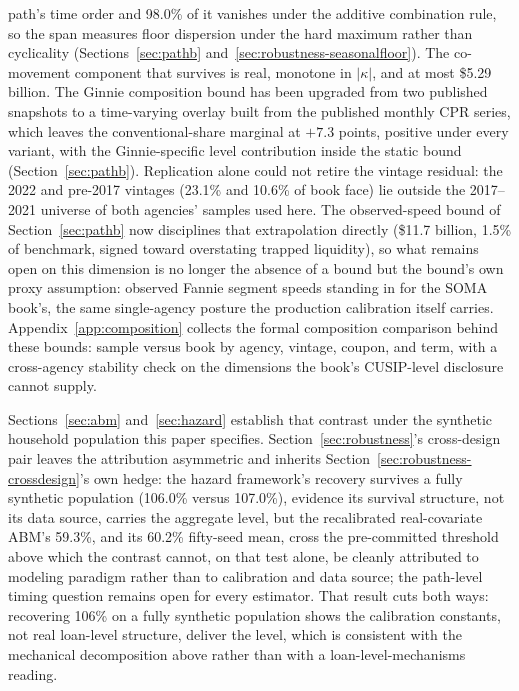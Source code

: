 \documentclass[12pt]{article}
\begin{document}
path's time order and 98.0\% of it vanishes under the additive combination rule, so the span measures floor dispersion under the hard maximum rather than cyclicality (Sections~\ref{sec:pathb} and~\ref{sec:robustness-seasonalfloor}). The co-movement component that survives is real, monotone in $|\kappa|$, and at most \$5.29 billion. The Ginnie composition bound has been upgraded from two published snapshots to a time-varying overlay built from the published monthly CPR series, which leaves the conventional-share marginal at $+7.3$ points, positive under every variant, with the Ginnie-specific level contribution inside the static bound (Section~\ref{sec:pathb}). Replication alone could not retire the vintage residual: the 2022 and pre-2017 vintages (23.1\% and 10.6\% of book face) lie outside the 2017--2021 universe of both agencies' samples used here. The observed-speed bound of Section~\ref{sec:pathb} now disciplines that extrapolation directly (\$11.7 billion, 1.5\% of benchmark, signed toward overstating trapped liquidity), so what remains open on this dimension is no longer the absence of a bound but the bound's own proxy assumption: observed Fannie segment speeds standing in for the SOMA book's, the same single-agency posture the production calibration itself carries. Appendix~\ref{app:composition} collects the formal composition comparison behind these bounds: sample versus book by agency, vintage, coupon, and term, with a cross-agency stability check on the dimensions the book's CUSIP-level disclosure cannot supply.

Sections~\ref{sec:abm} and~\ref{sec:hazard} establish that contrast under the synthetic household population this paper specifies. Section~\ref{sec:robustness}'s cross-design pair leaves the attribution asymmetric and inherits Section~\ref{sec:robustness-crossdesign}'s own hedge: the hazard framework's recovery survives a fully synthetic population (106.0\% versus 107.0\%), evidence its survival structure, not its data source, carries the aggregate level, but the recalibrated real-covariate ABM's 59.3\%, and its 60.2\% fifty-seed mean, cross the pre-committed threshold above which the contrast cannot, on that test alone, be cleanly attributed to modeling paradigm rather than to calibration and data source; the path-level timing question remains open for every estimator. That result cuts both ways: recovering 106\% on a fully synthetic population shows the calibration constants, not real loan-level structure, deliver the level, which is consistent with the mechanical decomposition above rather than with a loan-level-mechanisms reading.
\end{document}
